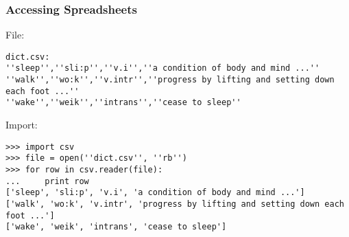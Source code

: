 \begin{frame}[fragile]\frametitle{Accessing Spreadsheets}
File:
\begin{lstlisting}
dict.csv:
''sleep'',''sli:p'',''v.i'',''a condition of body and mind ...''
''walk'',''wo:k'',''v.intr'',''progress by lifting and setting down each foot ...''
''wake'',''weik'',''intrans'',''cease to sleep''

\end{lstlisting}

Import:

\begin{lstlisting}
>>> import csv
>>> file = open(''dict.csv'', ''rb'')
>>> for row in csv.reader(file):
...     print row
['sleep', 'sli:p', 'v.i', 'a condition of body and mind ...']
['walk', 'wo:k', 'v.intr', 'progress by lifting and setting down each foot ...']
['wake', 'weik', 'intrans', 'cease to sleep']
\end{lstlisting}
\end{frame}
%
%        



